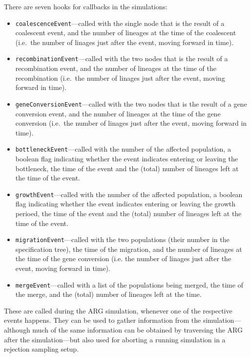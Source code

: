 \documentclass{manual}
\begin{document}
\begin{empfile}
There are seven hooks for callbacks in the simulations:
\begin{itemize}
\item \texttt{coalescenceEvent}---called with the single node
  that is the result of a coalescent event, and the number of lineages
  at the time of the coalescent (i.e.\ the number of linages just after
  the event, moving forward in time).
\item \texttt{recombinationEvent}---called with the two nodes
  that is the result of a recombination event, and the number of
  lineages at the time of the recombination (i.e.\ the number of
  linages just after the event, moving forward in time).
\item \texttt{geneConversionEvent}---called with the two nodes
  that is the result of a gene conversion event, and the number of
  lineages at the time of the gene conversion (i.e.\ the number of
  linages just after the event, moving forward in time).
\item \texttt{bottleneckEvent}---called with the number of the
  affected population, a boolean flag indicating whether the event
  indicates entering or leaving the bottleneck, the time of the event
  and the (total) number of lineages left at the time of the event.
\item \texttt{growthEvent}---called with the number of the
  affected population, a boolean flag indicating whether the event
  indicates entering or leaving the growth perioed, the time of the
  event and the (total) number of lineages left at the time of the
  event.
\item \texttt{migrationEvent}---called with the two populations
  (their number in the specification tree), the time of the migration,
  and the number of lineages at the time of the gene conversion
  (i.e. the number of linages just after the event, moving forward in
  time).
\item \texttt{mergeEvent}---called with a list of the
  populations being merged, the time of the merge, and the (total)
  number of lineages left at the time.
\end{itemize}

These are called during the ARG simulation, whenever one of the
respective events happens.  They can be used to gather information
from the simulation---although much of the same information can be
obtained by traversing the ARG after the simulation---but also used
for aborting a running simulation in a rejection sampling setup.


\end{empfile}
\end{document}
